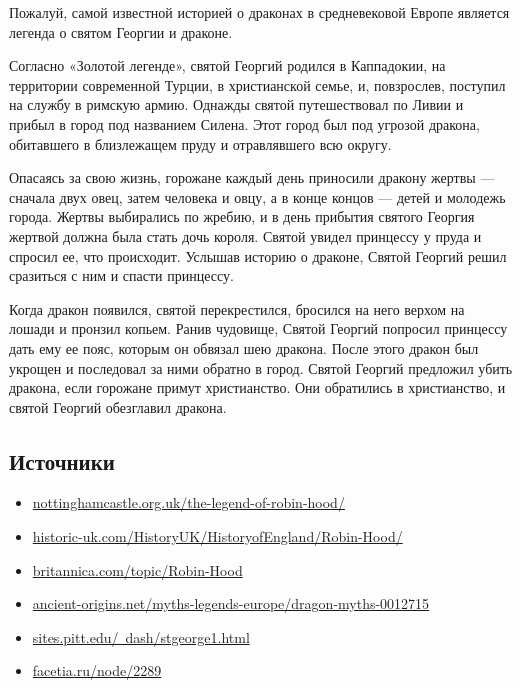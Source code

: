 Пожалуй, самой известной историей о драконах в средневековой Европе
является легенда о святом Георгии и драконе.

Согласно «Золотой легенде», святой Георгий родился в Каппадокии, на территории современной Турции, в христианской семье, и, повзрослев, поступил на службу в римскую армию. Однажды святой путешествовал по Ливии и прибыл в город под названием Силена. Этот город был под угрозой дракона, обитавшего в близлежащем пруду и отравлявшего всю округу.

Опасаясь за свою жизнь, горожане каждый день приносили дракону жертвы — сначала двух овец, затем человека и овцу, а в конце концов — детей и молодежь города. Жертвы выбирались по жребию, и в день прибытия святого Георгия жертвой должна была стать дочь короля. Святой увидел принцессу у пруда и спросил ее, что происходит. Услышав историю о драконе, Святой Георгий решил сразиться с ним и спасти принцессу.

Когда дракон появился, святой перекрестился, бросился на него верхом на лошади и пронзил копьем. Ранив чудовище, Святой Георгий попросил принцессу дать ему ее пояс, которым он обвязал шею дракона. После этого дракон был укрощен и последовал за ними обратно в город. Святой Георгий предложил убить дракона, если горожане примут христианство. Они обратились в христианство, и святой Георгий обезглавил дракона.

\newpage

\subsection*{Источники}

\begin{itemize}
    \item \href{https://www.nottinghamcastle.org.uk/the-legend-of-robin-hood/}{nottinghamcastle.org.uk/the-legend-of-robin-hood/} \\
    \item \href{https://www.historic-uk.com/HistoryUK/HistoryofEngland/Robin-Hood/}{historic-uk.com/HistoryUK/HistoryofEngland/Robin-Hood/} \\
    \item \href{https://www.britannica.com/topic/Robin-Hood}{britannica.com/topic/Robin-Hood} \\
    \item \href{https://www.ancient-origins.net/myths-legends-europe/dragon-myths-0012715}{ancient-origins.net/myths-legends-europe/dragon-myths-0012715} \\
    \item \href{https://sites.pitt.edu/~dash/stgeorge1.html}{sites.pitt.edu/~dash/stgeorge1.html}
    \item \href{https://facetia.ru/node/2289}{facetia.ru/node/2289} \\
\end{itemize}



